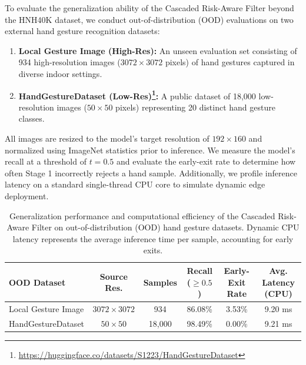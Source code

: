 \documentclass{bmvc2k}
\begin{document}
To evaluate the generalization ability of the Cascaded Risk-Aware Filter beyond the HNH40K dataset, we conduct out-of-distribution (OOD) evaluations on two external hand gesture recognition datasets:
\begin{enumerate}[label=(\roman*)]
    \item \textbf{Local Gesture Image (High-Res):} An unseen evaluation set consisting of 934 high-resolution images ($3072 \times 3072$ pixels) of hand gestures captured in diverse indoor settings.
    \item \textbf{HandGestureDataset (Low-Res)\footnote{\url{https://huggingface.co/datasets/S1223/HandGestureDataset}}:} A public dataset of 18,000 low-resolution images ($50 \times 50$ pixels) representing 20 distinct hand gesture classes.
\end{enumerate}
All images are resized to the model's target resolution of $192 \times 160$ and normalized using ImageNet statistics prior to inference. We measure the model's recall at a threshold of $t = 0.5$ and evaluate the early-exit rate to determine how often Stage 1 incorrectly rejects a hand sample. Additionally, we profile inference latency on a standard single-thread CPU core to simulate dynamic edge deployment.

\begin{table}[H]
\centering
\footnotesize
\vspace{2mm}
\begin{tabular}{@{}l c c c c c@{}}
\hline
\textbf{OOD Dataset} & \textbf{Source Res.} & \textbf{Samples} & \textbf{Recall ($\ge 0.5$)} & \textbf{Early-Exit Rate} & \textbf{Avg. Latency (CPU)} \\
\hline
Local Gesture Image & $3072 \times 3072$ & 934 & 86.08\% & 3.53\% & 9.20 ms \\
HandGestureDataset & $50 \times 50$ & 18{,}000 & 98.49\% & 0.00\% & 9.21 ms \\
\hline
\end{tabular}
\vspace{3mm}
\caption{Generalization performance and computational efficiency of the Cascaded Risk-Aware Filter on out-of-distribution (OOD) hand gesture datasets. Dynamic CPU latency represents the average inference time per sample, accounting for early exits.}
\label{tab:supp-ood-generalization}
\end{table}
\end{document}
